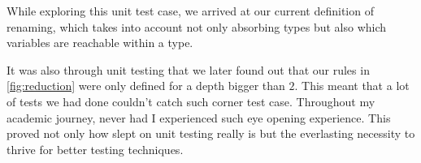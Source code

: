 While exploring this unit test case, we arrived at our current definition of renaming, which takes into account not only absorbing types but also which variables are reachable within a type. 

It was also through unit testing that we later found out that our rules in \cref*{fig:reduction} were only defined for a depth bigger than $2$. This meant that a lot of tests we had done couldn't catch such corner test case. Throughout my academic journey, never had I experienced such eye opening experience. This proved not only how slept on unit testing really is but the everlasting necessity to thrive for better testing techniques.




\LIMPA